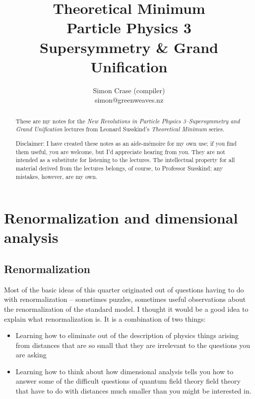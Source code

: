 \documentclass[]{article}
\title{Theoretical Minimum\\Particle Physics 3\\Supersymmetry \& Grand Unification}
\author{Simon Crase (compiler)\\simon@greenweaves.nz}
\begin{document}
\maketitle

\begin{abstract}
	These are my notes for the \emph{New Revolutions in Particle Physics 3--Supersymmetry and Grand Unification} lectures from Leonard Susskind's \emph{Theoretical Minimum} series\cite{susskind2007theoretical}. 
	
	Disclaimer: I have created these notes as an aide-m\'emoire for my own use; if you find them useful, you are welcome, but I'd appreciate hearing from you. They are not intended 
	as a substitute for listening to the lectures. The intellectual property for all material derived from the lectures belongs, of course, to Professor Susskind; any mistakes, however, are my own.
	
\end{abstract}

\tableofcontents
\listoffigures
\listoftables
\listoftheorems

\section{Renormalization  and dimensional analysis}\label{sect:renormalization}

\subsection{Renormalization}

Most of the basic ideas of this quarter originated out of questions having to do with renormalization -- sometimes puzzles, sometimes useful observations about the renormalization of the standard model. I thought it would be a good idea to explain what renormalization is. It  is a combination of two things:
\begin{itemize}
	\item Learning how to eliminate out of the description of physics things arising from distances that are so small that they are irrelevant to the questions you are asking
	\item Learning how to think about how dimensional analysis tells you how to answer some of the difficult questions of quantum field theory field theory that have to do with distances much smaller than you might be interested in.
\end{itemize}
\end{document}
